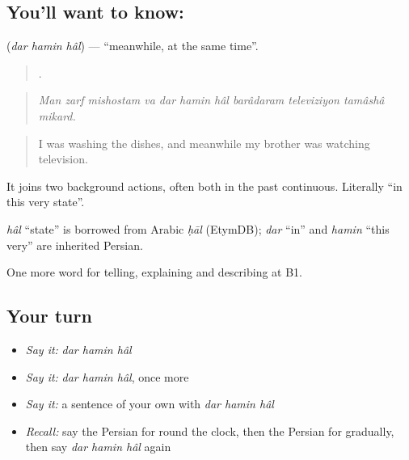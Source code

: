 \subsection*{You'll want to know:   }
\textbf{  } (\emph{dar hamin hâl}) — \textquotedblleft{}meanwhile, at the same time\textquotedblright{}.

\begin{quote}
          .
\end{quote}

\begin{quote}
\emph{Man zarf mishostam va dar hamin hâl barâdaram televiziyon tamâshâ mikard.}
\end{quote}

\begin{quote}
I was washing the dishes, and meanwhile my brother was watching television.
\end{quote}

It joins two background actions, often both in the past continuous. Literally \textquotedblleft{}in this very state\textquotedblright{}.

\begin{cousinweb}
\emph{hâl} \textquotedblleft{}state\textquotedblright{} is borrowed from Arabic \emph{ḥāl} (EtymDB); \emph{dar} \textquotedblleft{}in\textquotedblright{} and \emph{hamin} \textquotedblleft{}this very\textquotedblright{} are inherited Persian.
\end{cousinweb}

\begin{grammarlens}[title={What you've built}]
One more word for telling, explaining and describing at B1.
\end{grammarlens}

\subsection*{Your turn}
\begin{itemize}
\raggedright
  \item \emph{Say it:} \emph{dar hamin hâl}
  \item \emph{Say it:} \emph{dar hamin hâl}, once more
  \item \emph{Say it:} a sentence of your own with \emph{dar hamin hâl}
  \item \emph{Recall:} say the Persian for round the clock, then the Persian for gradually, then say \emph{dar hamin hâl} again
\end{itemize}


